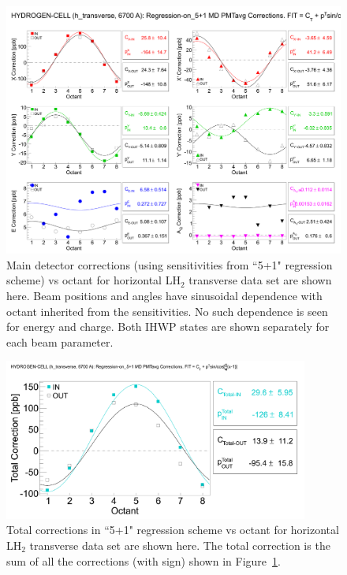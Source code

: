 \begin{figure}[!h]
	\begin{center}
	\includegraphics[width=15.0cm]{figures/MD_h_transverse_5+1_corrections}
	\end{center}
	\caption
	{Main detector corrections (using sensitivities from ``5+1" regression scheme) vs octant for horizontal LH$_{2}$ transverse data set are shown here. Beam positions and angles have sinusoidal dependence with octant inherited from the sensitivities. No such dependence is seen for energy and charge. Both IHWP states are shown separately for each beam parameter.}
	\label{fig:MD_h_transverse_5+1_corrections}
\end{figure}

\begin{figure}[!h]
	\begin{center}
	\includegraphics[width=10.0cm]{figures/MD_h_transverse_5+1_TotalCorrections}
	\end{center}
	\caption
	{Total corrections in ``5+1" regression scheme vs octant for horizontal LH$_{2}$ transverse data set are shown here. The total correction is the sum of all the corrections (with sign) shown in Figure~\ref{fig:MD_h_transverse_5+1_corrections}.}
	\label{fig:MD_h_transverse_5+1_TotalCorrections}
\end{figure}



